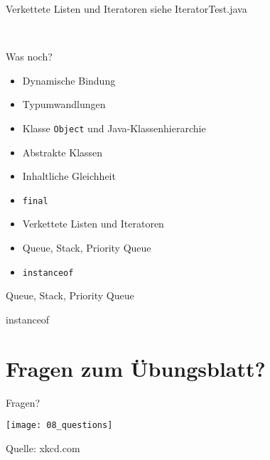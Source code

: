 \documentclass[18pt]{beamer}
\begin{document}
\begin{frame}{Verkettete Listen und Iteratoren}
 siehe IteratorTest.java
\end{frame}

\

\begin{frame}[fragile]{Was noch?}
\begin{itemize}
 \item Dynamische Bindung \checkmark
 \item Typumwandlungen \checkmark
 \item Klasse \verb|Object| und Java-Klassenhierarchie \checkmark
 \item Abstrakte Klassen \checkmark
 \item Inhaltliche Gleichheit \checkmark
 \item \verb|final| \checkmark
 \item Verkettete Listen und Iteratoren \checkmark
 \item Queue, Stack, Priority Queue
 \item \verb|instanceof|
\end{itemize}
\end{frame}

\begin{frame}{Queue, Stack, Priority Queue}
 
\end{frame}

\begin{frame}{instanceof}
 
\end{frame}









\section{Fragen zum Übungsblatt?}
\begin{frame}{Fragen?}
\end{frame}



\begin{frame}{}
 \texttt{[image: 08\_questions]}
 
 \tiny{Quelle: xkcd.com}
\end{frame}
\end{document}

